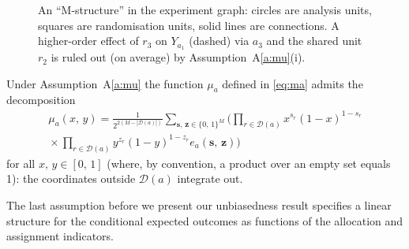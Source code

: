 \documentclass[sigconf,nonacm]{acmart}
\newcounter{assumption}
\newcommand{\nn}{\nonumber}
\begin{document}
\begin{figure}
\centering
{}
\caption{An ``M-structure'' in the experiment graph: circles are analysis units, squares are randomisation units, solid lines are connections. A higher-order effect of $r_3$ on $Y_{a_1}$ (dashed) via $a_3$ and the shared unit $r_2$ is ruled out (on average) by Assumption~A\ref{a:mu}(i).}
\label{fig:m-structure}
\end{figure}

Under Assumption~A\ref{a:mu} the function $\mu_a$ defined in \eqref{eq:ma} admits the decomposition
\begin{eqnarray}\label{eq:mu-decomp}
    \mu_a(x,\,y) = \frac 1 {2^{2(M-|\mathcal D(a)|)}}\sum_{\textbf{s},\,\textbf{z}\in\{0,\,1\}^M} \Bigg( \prod_{r\in \mathcal{D}(a)} x^{s_r}(1-x)^{1-s_r} \nn\\{}\times \prod_{r\in \mathcal{D}(a)}
    y^{z_r}(1-y)^{1-z_r}e_a(\textbf{s},\,\textbf{z})\Bigg)
\end{eqnarray}
for all $x,\,y\in[0,\,1]$ (where, by convention, a product over an empty set equals 1): the coordinates outside $\mathcal D(a)$ integrate out.

The last assumption before we present our unbiasedness result specifies a linear structure for the conditional expected outcomes as functions of the allocation and assignment indicators.
\end{document}
